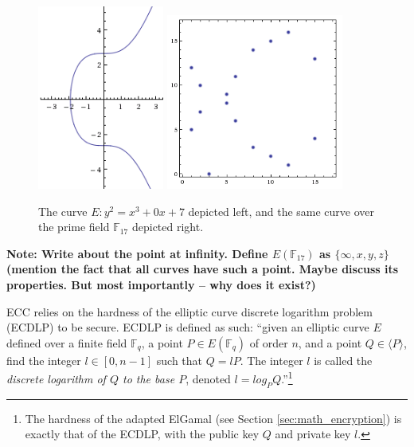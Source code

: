 \begin{figure}[htb]
	\centering
	\includegraphics[width=0.37\textwidth]{introduction/secp256k1-graph}
	\includegraphics[width=0.52\textwidth]{introduction/secp256k1-graph-over-field-p17}
	\caption{The curve \(E: y^2 = x^3 + 0x + 7\) depicted left, and the same curve over the prime field
		\(\mathbb{F}_{17}\) depicted right.}
	\label{fig:graphs}
\end{figure}

\textbf{Note: Write about the point at infinity. Define \(E(\mathbb{F}_{17})\) as \(\{\infty, x,y,z\}\) (mention
the fact that all curves have such a point. Maybe discuss its properties. But most importantly -- why does it exist?)}

ECC relies on the hardness of the elliptic curve discrete logarithm problem (ECDLP) to be secure. ECDLP is
defined as such: ``given an elliptic curve \(E\) defined over a finite field \(\mathbb{F}_q\), a point
\(P \in E(\mathbb{F}_q)\) of order \(n\), and a point \(Q \in \langle P \rangle\), find the integer
\(l \in [0,n-1]\) such that \(Q = lP\). The integer \(l\) is called the \emph{discrete logarithm of
\(Q\) to the base \(P\)}, denoted \(l = log_P Q\).''\footnote{The hardness of the adapted ElGamal (see
Section \ref{sec:math_encryption}) is exactly that of the ECDLP, with the public key \(Q\) and private
key \(l\).}\cite{hankerson2010}

